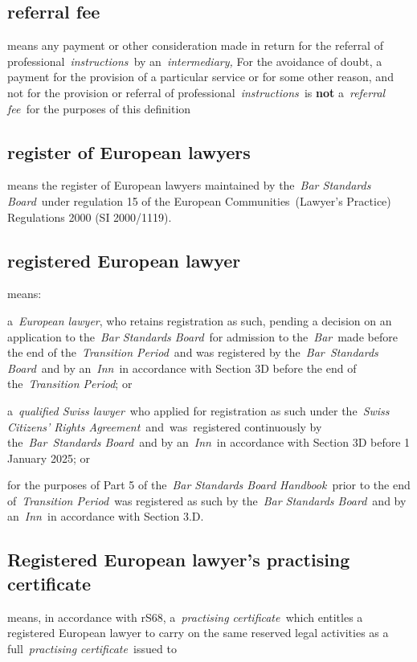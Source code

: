    \subsection{referral fee } means any payment or other consideration made
  in return for the referral of professional~\emph{instructions~}by
  an~\emph{intermediary,} For the avoidance of doubt, a payment for the
  provision of a particular service or for some other reason, and not
  for the provision or referral of professional~\emph{instructions~}is
  \textbf{not} a~\emph{referral fee~}for the purposes of this definition  \subsection{register of European lawyers } means the register of European
  lawyers maintained by the~\emph{Bar Standards Board}~under regulation
  15 of the European Communities~(Lawyer's Practice) Regulations 2000
  (SI 2000/1119).  \subsection{registered European lawyer } means:
\al \item a~\emph{European
  lawyer}, who retains registration as such, pending a decision on an application to the~\emph{Bar Standards Board}~for admission to the~\emph{Bar}~made before the end of the~\emph{Transition Period}~and was registered by the~\emph{Bar~Standards Board}~and by
  an~\emph{Inn}~in accordance with Section 3D before the end of
  the~\emph{Transition Period}; or \item a~\emph{qualified Swiss
  lawyer}~who applied for registration as such under the~\emph{Swiss
  Citizens' Rights Agreement}~and~was\emph{~}registered continuously by
  the~\emph{Bar~Standards Board}~and by an~\emph{Inn}~in accordance with
  Section 3D before 1 January 2025; or
  \item for the purposes of Part 5 of
  the~\emph{Bar Standards Board Handbook}~prior to the end
  of~\emph{Transition Period}~was registered as such by the~\emph{Bar
  Standards Board}~and by an~\emph{Inn~}in accordance with Section
  3.D.\la  \subsection{Registered European lawyer's practising certificate } means,
  in accordance with rS68, a~\emph{practising certificate~}which
  entitles a registered European lawyer to carry on the same reserved
  legal activities as a full~\emph{practising certificate~}issued to
